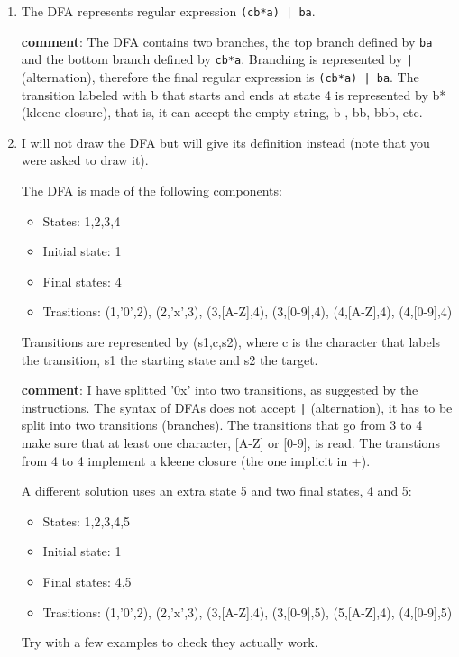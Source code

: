 \documentclass{article}
\newcommand{\comment}{\textbf{comment}}
\begin{document}
\begin{enumerate}
\item The DFA represents regular expression \verb+(cb*a) | ba+.

\comment: The DFA contains two branches, the top branch defined by \verb+ba+ and the bottom branch defined by \verb+cb*a+. Branching is represented by \verb+|+ (alternation), therefore the final regular expression is  \verb+(cb*a) | ba+. The transition labeled with b that starts and ends at state 4  is represented by b* (kleene closure), that is, it can accept the empty string, b , bb, bbb, etc.

\item I will not draw the DFA but will give its definition instead (note that you were asked to draw it).

The DFA is made of the following components:
\begin{itemize}
\item States: 1,2,3,4
\item Initial state: 1
\item Final states: 4
\item Trasitions: (1,'0',2), (2,'x',3), (3,[A-Z],4), (3,[0-9],4), (4,[A-Z],4), (4,[0-9],4) 
\end{itemize}

Transitions are represented by (s1,c,s2), where c is the character that labels the transition, s1 the starting state and s2 the target.

\comment: I have splitted '0x' into two transitions, as suggested by the instructions. The syntax of DFAs does not accept \verb+|+ (alternation), it has to be split into two transitions (branches). The transitions that go from 3 to 4 make sure that at least one character, [A-Z] or [0-9], is read. The transtions from  4 to 4 implement a kleene closure (the one implicit in +).

A different solution uses an extra state 5 and two final states, 4 and 5:
\begin{itemize}
\item States: 1,2,3,4,5
\item Initial state: 1
\item Final states: 4,5
\item Trasitions: (1,'0',2), (2,'x',3), (3,[A-Z],4), (3,[0-9],5), (5,[A-Z],4), (4,[0-9],5) 
\end{itemize}

Try with a few examples to check they actually work.

\end{enumerate}
\end{document}
